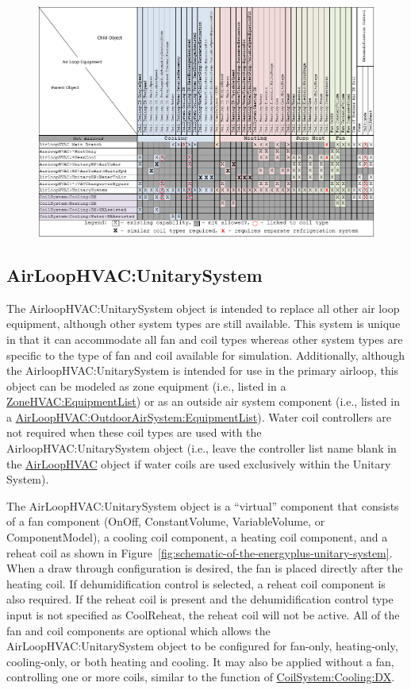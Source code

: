 \begin{figure}[htbp]
\centering
\includegraphics{media/AirLoopComponentMatrix.png}
\caption{}
\end{figure}

\subsection{AirLoopHVAC:UnitarySystem}\label{airloophvacunitarysystem}

The AirloopHVAC:UnitarySystem object is intended to replace all other air loop equipment, although other system types are still available. This system is unique in that it can accommodate all fan and coil types whereas other system types are specific to the type of fan and coil available for simulation. Additionally, although the AirloopHVAC:UnitarySystem is intended for use in the primary airloop, this object can be modeled as zone equipment (i.e., listed in a \hyperref[zonehvacequipmentlist]{ZoneHVAC:EquipmentList}) or as an outside air system component (i.e., listed in a \hyperref[airloophvacoutdoorairsystemequipmentlist]{AirLoopHVAC:OutdoorAirSystem:EquipmentList}). Water coil controllers are not required when these coil types are used with the AirloopHVAC:UnitarySystem object (i.e., leave the controller list name blank in the \hyperref[airloophvac]{AirLoopHVAC} object if water coils are used exclusively within the Unitary System).

The AirLoopHVAC:UnitarySystem object is a ``virtual'' component that consists of a fan component (OnOff, ConstantVolume, VariableVolume, or ComponentModel), a cooling coil component, a heating coil component, and a reheat coil as shown in Figure~\ref{fig:schematic-of-the-energyplus-unitary-system}. When a draw through configuration is desired, the fan is placed directly after the heating coil. If dehumidification control is selected, a reheat coil component is also required. If the reheat coil is present and the dehumidification control type input is not specified as CoolReheat, the reheat coil will not be active. All of the fan and coil components are optional which allows the AirLoopHVAC:UnitarySystem object to be configured for fan-only, heating-only, cooling-only, or both heating and cooling. It may also be applied without a fan, controlling one or more coils, similar to the function of \hyperref[coilsystemcoolingdx]{CoilSystem:Cooling:DX}.

